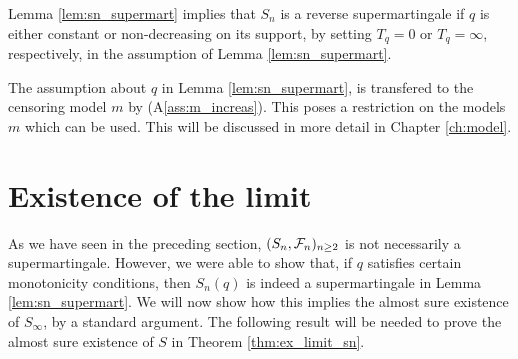 %
\begin{remark}
	Lemma \ref{lem:sn_supermart} implies that $S_n$ is a reverse supermartingale if $q$ is either constant or non-decreasing on its support, by setting $T_q = 0$ or $T_q = \infty$, respectively, in the assumption of Lemma \ref{lem:sn_supermart}.
\end{remark}
%
The assumption about $q$  in Lemma \ref{lem:sn_supermart}, is transfered to the censoring model $m$ by (A\ref{ass:m_increas}). This poses a restriction on the models $m$ which can be used. This will be discussed in more detail in Chapter \ref{ch:model}.
%
%
%
\section{Existence of the limit} \label{sec:ex_limit}
As we have seen in the preceding section, $(S_n, \mathcal{F}_n)_{n\geq 2}$ is not necessarily a supermartingale. However, we were able to show that, if $q$ satisfies certain monotonicity conditions, then $S_n(q)$ is indeed a supermartingale in Lemma \ref{lem:sn_supermart}. We will now show how this implies the almost sure existence of $S_\infty$, by a standard argument. 
%
The following result will be needed to prove the almost sure existence of $S$ in Theorem \ref{thm:ex_limit_sn}.
